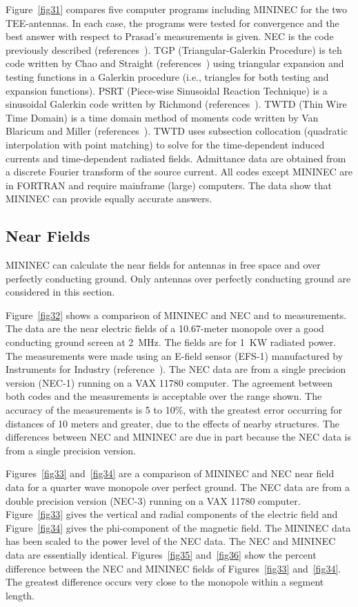 \documentclass[12pt]{article}
\begin{document}
Figure~\ref{fig31} compares five computer programs including MININEC for
the two TEE-antennas. In each case, the programs were tested for
convergence and the best answer with respect to Prasad's measurements is
given. NEC is the code previously described (references~\cite{r4}). TGP
(Triangular-Galerkin Procedure) is teh code written by Chao and Straight
(references~\cite{r11}) using triangular expansion and testing functions
in a Galerkin procedure (i.e., triangles for both testing and expansion
functions). PSRT (Piece-wise Sinusoidal Reaction Technique) is a
sinusoidal Galerkin code written by Richmond (references~\cite{r19}).
TWTD (Thin Wire Time Domain) is a time domain method of moments code
written by Van Blaricum and Miller (references~\cite{r20}). TWTD uses
subsection collocation (quadratic interpolation with point matching) to
solve for the time-dependent induced currents and time-dependent
radiated fields. Admittance data are obtained from a discrete Fourier
transform of the source current. All codes except MININEC are in FORTRAN
and require mainframe (large) computers. The data show that MININEC can
provide equally accurate answers.

\subsection{Near Fields}
MININEC can calculate the near fields for antennas in free space and
over perfectly conducting ground. Only antennas over perfectly
conducting ground are considered in this section.

Figure~\ref{fig32} shows a comparison of MININEC and NEC and to
measurements. The data are the near electric fields of a 10.67-meter
monopole over a good conducting ground screen at 2~MHz. The fields are
for 1~KW radiated power. The measurements were made using an E-field
sensor (EFS-1) manufactured by Instruments for Industry
(reference~\cite{r21}). The NEC data are from a single precision version
(NEC-1) running on a VAX 11780 computer. The agreement between both
codes and the measurements is acceptable over the range shown. The
accuracy of the measurements is 5 to 10\%, with the greatest error
occurring for distances of 10 meters and greater, due to the effects of
nearby structures. The differences between NEC and MININEC are due in
part because the NEC data is from a single precision version.

Figures~\ref{fig33} and~\ref{fig34} are a comparison of MININEC and NEC
near field data for a quarter wave monopole over perfect ground. The NEC
data are from a double precision version (NEC-3) running on a VAX 11780
computer. Figure~\ref{fig33} gives the vertical and radial components of
the electric field and Figure~\ref{fig34} gives the phi-component of the
magnetic field. The MININEC data has been scaled to the power level of
the NEC data. The NEC and MININEC data are essentially identical.
Figures~\ref{fig35} and~\ref{fig36} show the percent difference between
the NEC and MININEC fields of Figures~\ref{fig33} and~\ref{fig34}. The
greatest difference occurs very close to the monopole within a segment
length.
\end{document}
